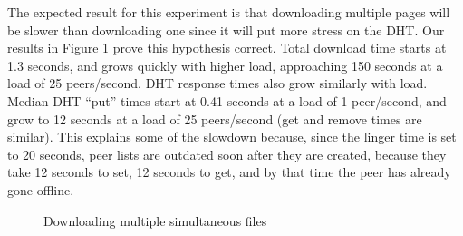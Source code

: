 The expected result for this experiment is that downloading multiple pages will be slower than downloading one 
since it will put more stress on the DHT.  Our results in Figure \ref{fig:multiple_files} prove
this hypothesis correct.  Total download time starts at 1.3 seconds, and grows quickly with higher load, approaching 
150 seconds at a load of 25 peers/second. DHT response times also grow similarly with load.  Median DHT ``put'' times start 
at 0.41 seconds at a load of 1 peer/second, and grow to 12 seconds at a load of 25 peers/second (get and remove times are similar).
This explains some of the slowdown because, since the linger time is set to 20 seconds, peer lists are outdated soon after they are created, because
they take 12 seconds to set, 12 seconds to get, and by that time the peer has already gone offline.


\begin{figure}\begin{center} 
 \label{fig:multiple_files}
    \caption[]{Downloading multiple simultaneous files}
    \end{center}
    \end{figure}

